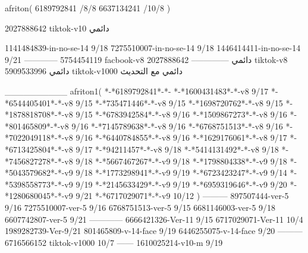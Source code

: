 afriton(
6189792841 /8/8
6637134241 /10/8
)

2027888642 tiktok-v10
دائمي



1141484839-in-no-se-14 9/18
7275510007-in-no-se-14 9/18
1446414411-in-no-se-14 9/21
------------
5754454119 facbook-v8
دائمي
--------------
2027888642 tiktok-v8
دائمي
5909533996 tiktok-v1000
دائمي مع التحديث

__________
afriton1(
*-*6189792841*-*-
*-*1600431483*-*-v8 9/17
*-*6544405401*-*-v8 9/15
*-*735471446*-*-v8 9/15
*-*1698720762*-*-v8 9/15
*-*1878818708*-*-v8 9/15
*-*6783942584*-*-v8 9/16
*-*1509867273*-*-v8 9/16
*-*801465809*-*-v8 9/16
*-*7145789638*-*-v8 9/16
*-*6768751513*-*-v8 9/16
*-*7022049118*-*-v8 9/16
*-*6440784855*-*-v8 9/16
*-*1629176061*-*-v8 9/17
*-*6713425804*-*-v8 9/17
*-*94211457*-*-v8 9/18
*-*5414131492*-*-v8 9/18
*-*7456827278*-*-v8 9/18
*-*5667467267*-*-v9 9/18
*-*1798804338*-*-v9 9/18
*-*5043579682*-*-v9 9/18
*-*1773298941*-*-v9 9/19
*-*6723423247*-*-v9 9/14
*-*5398558773*-*-v9 9/19
*-*2145633429*-*-v9 9/19
*-*6959319646*-*-v9 9/20
*-*1280680045*-*-v9 9/21
*-*6717029071*-*-v9 10/12
)
---------
897507444-ver-5 9/16
7275510007-ver-5 9/16
6768751513-ver-5 9/15
6681146003-ver-5 9/18
6607742807-ver-5 9/21
------------
6666421326-Ver-11
9/15
6717029071-Ver-11
10/4
1989282739-Ver-9/21
801465809-v-14-face 9/19
6446255075-v-14-face 9/20
---------
6716566152 tiktok-v1000
10/7
------
1610025214-v10-m 9/19
